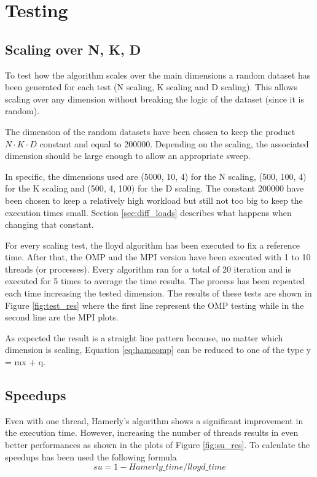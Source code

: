 \documentclass[conference]{IEEEtran}
\begin{document}
\section{Testing}
\subsection{Scaling over N, K, D}
To test how the algorithm scales over the main dimensions a random dataset has been generated for each test (N scaling, K scaling and D scaling). This allows scaling over any dimension without breaking the logic of the dataset (since it is random). 

The dimension of the random datasets have been chosen to keep the product $N\cdot K\cdot D$ constant and equal to 200000. Depending on the scaling, the associated dimension should be large enough to allow an appropriate sweep. 

In specific, the dimensions used are (5000, 10, 4) for the N scaling, (500, 100, 4) for the K scaling and (500, 4, 100) for the D scaling. The constant 200000 have been chosen to keep a relatively high workload but still not too big to keep the execution times small. Section \ref{sec:diff_loads} describes what happens when changing that constant.

For every scaling test, the lloyd algorithm has been executed to fix a reference time. After that, the OMP and the MPI version have been executed with 1 to 10 threads (or processes). Every algorithm ran for a total of 20 iteration and is executed for 5 times to average the time results. The process has been repeated each time increasing the tested dimension. The results of these tests are shown in Figure \ref{fig:test_res} where the first line represent the OMP testing while in the second line are the MPI plots.

As expected the result is a straight line pattern because, no matter which dimension is scaling, Equation \ref{eq:hamcomp} can be reduced to one of the type y = mx + q.

\subsection{Speedups}
Even with one thread, Hamerly's algorithm shows a significant improvement in the execution time. However, increasing the number of threads results in even better performances as shown in the plots of Figure \ref{fig:su_res}. To calculate the speedups has been used the following formula
\begin{equation}
  su = 1 - Hamerly\_time / lloyd\_time
\end{equation}
\end{document}
